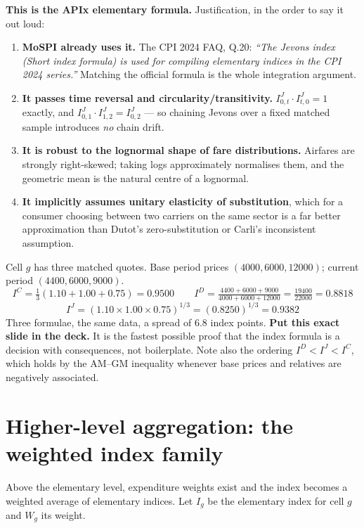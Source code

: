 \noindent \textbf{This is the APIx elementary formula.} Justification, in the order to say
it out loud:

\begin{enumerate}
\item \textbf{MoSPI already uses it.} The CPI 2024 FAQ, Q.20: \emph{``The Jevons index
(Short index formula) is used for compiling elementary indices in the CPI 2024 series.''}
Matching the official formula is the whole integration argument.
\item \textbf{It passes time reversal and circularity/transitivity.} $I^J_{0,t}\cdot
I^J_{t,0}=1$ exactly, and $I^J_{0,1}\cdot I^J_{1,2} = I^J_{0,2}$ --- so chaining Jevons over
a fixed matched sample introduces \emph{no} chain drift.
\item \textbf{It is robust to the lognormal shape of fare distributions.} Airfares are
strongly right-skewed; taking logs approximately normalises them, and the geometric mean is
the natural centre of a lognormal.
\item \textbf{It implicitly assumes unitary elasticity of substitution}, which for a
consumer choosing between two carriers on the same sector is a far better approximation
than Dutot's zero-substitution or Carli's inconsistent assumption.
\end{enumerate}

\begin{keybox}
 Cell $g$ has three matched quotes.
Base period prices $(4000, 6000, 12000)$; current period $(4400, 6000, 9000)$.
\[
I^{C} = \tfrac{1}{3}(1.10 + 1.00 + 0.75) = 0.9500
\qquad
I^{D} = \tfrac{4400+6000+9000}{4000+6000+12000} = \tfrac{19400}{22000} = 0.8818
\]
\[
I^{J} = (1.10 \times 1.00 \times 0.75)^{1/3} = (0.8250)^{1/3} = 0.9382
\]
Three formulae, the same data, a spread of 6.8 index points. \textbf{Put this exact slide
in the deck.} It is the fastest possible proof that the index formula is a decision with
consequences, not boilerplate. Note also the ordering $I^{D} < I^{J} < I^{C}$, which holds
by the AM--GM inequality whenever base prices and relatives are negatively associated.
\end{keybox}

\section{Higher-level aggregation: the weighted index family}

Above the elementary level, expenditure weights exist and the index becomes a weighted
average of elementary indices. Let $I_{g}$ be the elementary index for cell $g$ and $W_g$
its weight.

